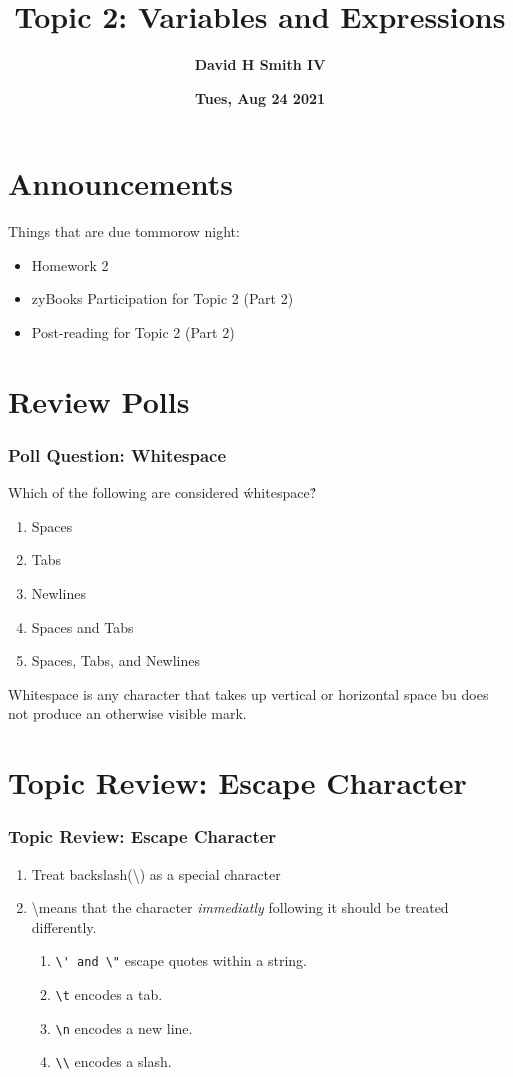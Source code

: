 \documentclass{beamer}
\title{\textbf{Topic 2: Variables and Expressions}}
\author{\textbf{David H Smith IV}}
\institute[\textbf{UIUC}]{\textbf{University of Illinois Urbana-Champaign}}
\date{\textbf{Tues, Aug 24 2021}}
\begin{document}
\frame{\titlepage}

\section{Announcements}

\begin{frame}
  Things that are due tommorow night:
    \begin{itemize}
      \item Homework 2
      \item zyBooks Participation for Topic 2 (Part 2) 
      \item Post-reading for Topic 2 (Part 2)
    \end{itemize}
\end{frame}

\section{Review Polls}

%
%
%
\begin{frame}[fragile]
  \frametitle{Poll Question: Whitespace}
  Which of the following are considered \'whitespace\'?
  \vfill
  \begin{enumerate}
    \item Spaces
    \item Tabs
    \item Newlines
    \item Spaces and Tabs
    \item Spaces, Tabs, and Newlines
  \end{enumerate}
  \pause
  \vfill
  Whitespace is any character that takes up vertical or horizontal space bu does not produce an otherwise visible mark.
\end{frame}

%
%
%
\section{Topic Review: Escape Character}
\begin{frame}[fragile]
  \frametitle{Topic Review: Escape Character}
  \begin{enumerate}
    \item Treat backslash(\textbackslash) as a special character
    \item \textbackslash means that the character \textit{immediatly} following it should be treated differently.
      \begin{enumerate}
        \item \lstinline{\' and \"} escape quotes within a string.
        \item \lstinline{\t} encodes a tab.
        \item \lstinline{\n} encodes a new line.
        \item \lstinline{\\} encodes a slash.
      \end{enumerate}
  \end{enumerate}
\end{frame}
\end{document}
